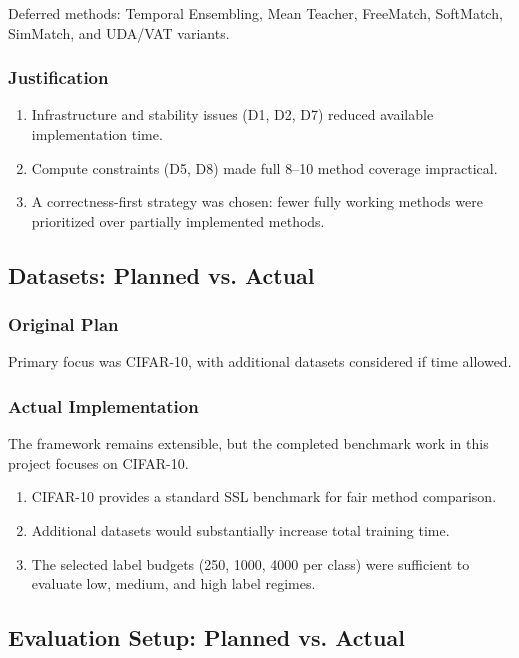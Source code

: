 Deferred methods: Temporal Ensembling, Mean Teacher, FreeMatch, SoftMatch, SimMatch, and UDA/VAT variants.

\subsubsection{Justification}

\begin{enumerate}
    \item Infrastructure and stability issues (D1, D2, D7) reduced available implementation time.
    \item Compute constraints (D5, D8) made full 8--10 method coverage impractical.
    \item A correctness-first strategy was chosen: fewer fully working methods were prioritized over partially implemented methods.
\end{enumerate}

\subsection{Datasets: Planned vs. Actual}

\subsubsection{Original Plan}

Primary focus was CIFAR-10, with additional datasets considered if time allowed.

\subsubsection{Actual Implementation}

The framework remains extensible, but the completed benchmark work in this project focuses on CIFAR-10.

\begin{enumerate}
    \item CIFAR-10 provides a standard SSL benchmark for fair method comparison.
    \item Additional datasets would substantially increase total training time.
    \item The selected label budgets (250, 1000, 4000 per class) were sufficient to evaluate low, medium, and high label regimes.
\end{enumerate}

\subsection{Evaluation Setup: Planned vs. Actual}

